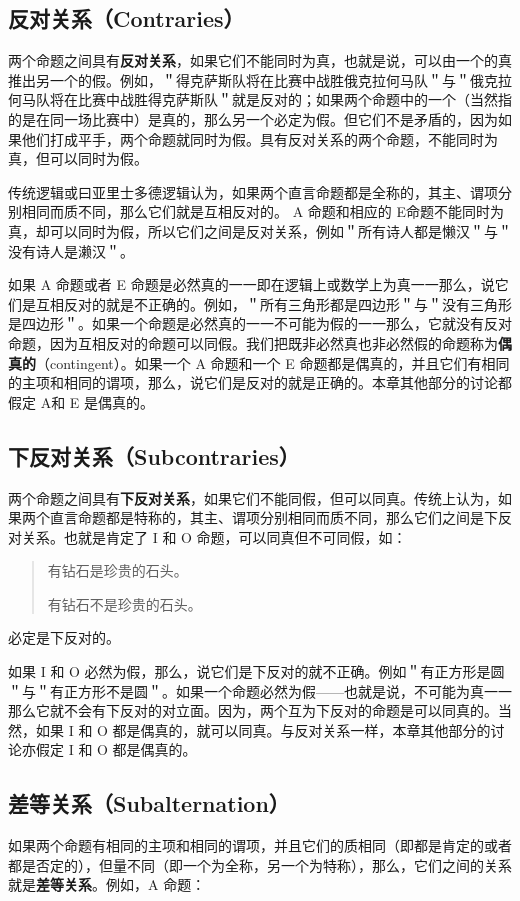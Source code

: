 \subsection{反对关系（Contraries）}
两个命题之间具有\textbf{反对关系}，如果它们不能同时为真，也就是说，可以由一个的真推出另一个的假。例如，＂得克萨斯队将在比赛中战胜俄克拉何马队＂与＂俄克拉何马队将在比赛中战胜得克萨斯队＂就是反对的；如果两个命题中的一个（当然指的是在同一场比赛中）是真的，那么另一个必定为假。但它们不是矛盾的，因为如果他们打成平手，两个命题就同时为假。具有反对关系的两个命题，不能同时为真，但可以同时为假。

传统逻辑或曰亚里士多德逻辑认为，如果两个直言命题都是全称的，其主、谓项分别相同而质不同，那么它们就是互相反对的。\cite{kneale1962} A 命题和相应的 E命题不能同时为真，却可以同时为假，所以它们之间是反对关系，例如＂所有诗人都是懒汉＂与＂没有诗人是濑汉＂。

如果 A 命题或者 E 命题是必然真的一一即在逻辑上或数学上为真一一那么，说它们是互相反对的就是不正确的。例如，＂所有三角形都是四边形＂与＂没有三角形是四边形＂。如果一个命题是必然真的一一不可能为假的一一那么，它就没有反对命题，因为互相反对的命题可以同假。我们把既非必然真也非必然假的命题称为\textbf{偶真的}（contingent）。如果一个 A 命题和一个 E 命题都是偶真的，并且它们有相同的主项和相同的谓项，那么，说它们是反对的就是正确的。本章其他部分的讨论都假定 A和 E 是偶真的。

\subsection{下反对关系（Subcontraries）}
两个命题之间具有\textbf{下反对关系}，如果它们不能同假，但可以同真。传统上认为，如果两个直言命题都是特称的，其主、谓项分别相同而质不同，那么它们之间是下反对关系。也就是肯定了 I 和 O 命题，可以同真但不可同假，如：

\begin{quote}
有钻石是珍贵的石头。

有钻石不是珍贵的石头。
\end{quote}

必定是下反对的。

如果 I 和 O 必然为假，那么，说它们是下反对的就不正确。例如＂有正方形是圆＂与＂有正方形不是圆＂。如果一个命题必然为假——也就是说，不可能为真一一那么它就不会有下反对的对立面。因为，两个互为下反对的命题是可以同真的。当然，如果 I 和 O 都是偶真的，就可以同真。与反对关系一样，本章其他部分的讨论亦假定 I 和 O 都是偶真的。

\subsection{差等关系（Subalternation）}
如果两个命题有相同的主项和相同的谓项，并且它们的质相同（即都是肯定的或者都是否定的），但量不同（即一个为全称，另一个为特称），那么，它们之间的关系就是\textbf{差等关系}。例如，A 命题：

